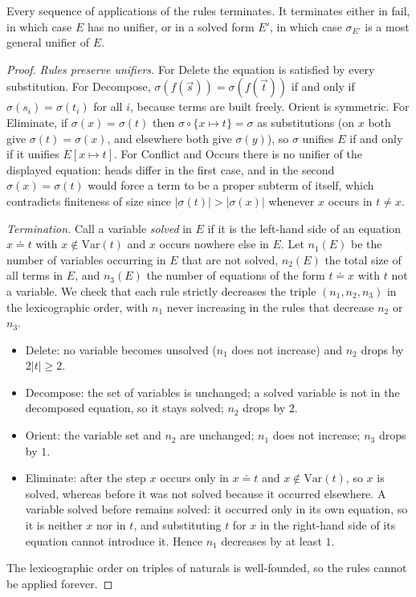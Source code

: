 \begin{theorem}[Unification]
\label{thm:unification}
Every sequence of applications of the rules terminates. It terminates either in \textsf{fail}, in which case $E$ has no unifier, or in a solved form $E'$, in which case $\sigma_{E'}$ is a most general unifier of $E$.
\end{theorem}

\begin{proof}
\emph{Rules preserve unifiers.} For \textsf{Delete} the equation is satisfied by every substitution. For \textsf{Decompose}, $\sigma(f(\vec s))=\sigma(f(\vec t))$ if and only if $\sigma(s_i)=\sigma(t_i)$ for all $i$, because terms are built freely. \textsf{Orient} is symmetric. For \textsf{Eliminate}, if $\sigma(x)=\sigma(t)$ then $\sigma\circ\{x\mapsto t\}=\sigma$ as substitutions (on $x$ both give $\sigma(t)=\sigma(x)$, and elsewhere both give $\sigma(y)$), so $\sigma$ unifies $E$ if and only if it unifies $E[x\mapsto t]$. For \textsf{Conflict} and \textsf{Occurs} there is no unifier of the displayed equation: heads differ in the first case, and in the second $\sigma(x)=\sigma(t)$ would force a term to be a proper subterm of itself, which contradicts finiteness of size since $|\sigma(t)|>|\sigma(x)|$ whenever $x$ occurs in $t\ne x$.

\emph{Termination.} Call a variable \emph{solved} in $E$ if it is the left-hand side of an equation $x\doteq t$ with $x\notin\mathrm{Var}(t)$ and $x$ occurs nowhere else in $E$. Let $n_1(E)$ be the number of variables occurring in $E$ that are not solved, $n_2(E)$ the total size of all terms in $E$, and $n_3(E)$ the number of equations of the form $t\doteq x$ with $t$ not a variable. We check that each rule strictly decreases the triple $(n_1,n_2,n_3)$ in the lexicographic order, with $n_1$ never increasing in the rules that decrease $n_2$ or $n_3$.
\begin{itemize}[nosep]
\item \textsf{Delete}: no variable becomes unsolved ($n_1$ does not increase) and $n_2$ drops by $2|t|\ge2$.
\item \textsf{Decompose}: the set of variables is unchanged; a solved variable is not in the decomposed equation, so it stays solved; $n_2$ drops by $2$.
\item \textsf{Orient}: the variable set and $n_2$ are unchanged; $n_1$ does not increase; $n_3$ drops by $1$.
\item \textsf{Eliminate}: after the step $x$ occurs only in $x\doteq t$ and $x\notin\mathrm{Var}(t)$, so $x$ is solved, whereas before it was not solved because it occurred elsewhere. A variable solved before remains solved: it occurred only in its own equation, so it is neither $x$ nor in $t$, and substituting $t$ for $x$ in the right-hand side of its equation cannot introduce it. Hence $n_1$ decreases by at least $1$.
\end{itemize}
The lexicographic order on triples of naturals is well-founded, so the rules cannot be applied forever.


\end{proof}
